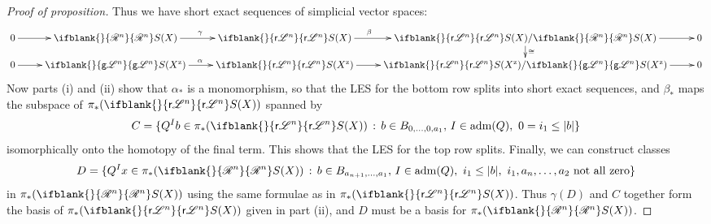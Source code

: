 \documentclass[11pt]{article}
\newcommand{\RestLie}[1]{\mathsf{r}{\scrL}^{#1}}%
\newcommand{\GoodLie}[1]{\mathsf{g}{\scrL}^{#1}}%
\newcommand{\PRLie}[1]{\scrR^{#1}}%
\newcommand{\LL}[1]{{\scrK}^{#1}}%
\newcommand{\admis}[1]{\mathrm{adm}(#1)}%
\newcommand{\Fr}[2][]{\ifblank{#1}{#2}{#2_{#1}}}
\renewcommand{\Q}{Q}
\begin{document}
\begin{CategoriesOfInterest}
\begin{proof}[Proof of proposition]
Thus we have short exact sequences of simplicial vector spaces:
\[\xymatrix@R=4mm{
0
\ar[r]
&%
\Fr{\PRLie{n}}S(X)
\ar[r]^\gamma
&%
\Fr{\RestLie{n}}S(X)
\ar[r]^-(.4)\beta&%
\Fr{\RestLie{n}}S(X)/\Fr{\PRLie{n}}S(X)
\ar[r]
\ar[d]^-{\cong}
&%
0\\%
0
\ar[r]
&%
\Fr{\GoodLie{n}}S(X^\textup{z})
\ar[r]^{\alpha}
&%
\Fr{\RestLie{n}}S(X^\textup{z})
\ar[r]&%
\Fr{\RestLie{n}}S(X^\textup{z})/\Fr{\GoodLie{n}}S(X^\textup{z})
\ar[r]
&%
0
}\]
Now parts (i) and (ii) show that $\alpha_*$ is a monomorphism, so that the LES for the bottom row splits into short exact sequences, and $\beta_*$ maps the subspace of $\pi_*(\Fr{\RestLie{n}}S(X))$ spanned by
\[C=\{\Q^Ib\in\pi_*(\Fr{\RestLie{n}}S(X))\,:\,b\in B_{0,\ldots,0,a_1},\,I\in\admis{\Q},\ 0= i_1\leq|b|\}\]
isomorphically onto the homotopy of the final term. This shows that the LES for the top row splits. Finally, we can construct classes 
\[D=\{\Q^Ix\in\pi_*(\Fr{\PRLie{n}}S(X))\,:\,b\in B_{a_{n+1},\ldots,a_1},\,I\in\admis{\Q},\ i_1\leq|b|,\ i_1,a_{n},\ldots,a_2\textup{ not all zero}\}\]
in $\pi_*(\Fr{\PRLie{n}}S(X))$ using the same formulae as in $\pi_*(\Fr{\RestLie{n}}S(X))$. Thus $\gamma(D)$ and $C$ together form the basis of $\pi_*(\Fr{\RestLie{n}}S(X))$ given in part (ii), and $D$ must be a basis for $\pi_*(\Fr{\PRLie{n}}S(X))$.
\end{proof}








\end{CategoriesOfInterest}
\end{document}
